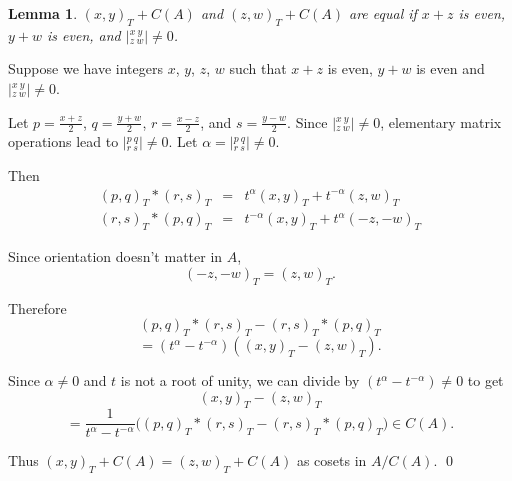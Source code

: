 \documentclass{slides}
\newtheorem{lemma}{Lemma}
\begin{document}
\begin{slide}
\begin{lemma}
$(x,y)_T + C(A)$ and $(z,w)_T + C(A)$ are equal
if $x + z$ is even, $y + w$ is
even, and ${|^{x~y}_{z~w}|} \neq 0$.
\label{lemma1}
\end{lemma}

\proof
Suppose we have integers $x$, $y$,
$z$, $w$ such that $x+z$ is even, $y + w$ is even and
${|^{x~y}_{z~w}|} \neq 0$.

Let $p = \frac{x+z}{2}$,
$q = \frac{y+w}{2}$, $r = \frac{x-z}{2}$, and $s = \frac{y-w}{2}$.
Since 
${|^{x~y}_{z~w}|} \neq 0$,
elementary matrix operations lead to
${|^{p~q}_{r~s}|} \neq 0$.
Let $\alpha =
{|^{p~q}_{r~s}|} \neq 0$.

Then 
\begin{eqnarray}
(p,q)_T * (r,s)_T & = & t^{\alpha} (x,y)_T + t^{-\alpha} (z,w)_T \nonumber \\
(r,s)_T * (p,q)_T & = & t^{-\alpha} (x,y)_T + t^{\alpha} (-z,-w)_T \nonumber
\end{eqnarray}
\end{slide}

\begin{slide}
Since orientation doesn't matter in $A$,
$$(-z,-w)_T = (z,w)_T.$$

Therefore
$$(p,q)_T * (r,s)_T - (r,s)_T * (p,q)_T$$
$$ = (t^{\alpha} - t^{-\alpha})((x,y)_T - (z,w)_T).$$

Since $\alpha \neq 0$ and $t$ is not a root of unity, we can divide by
$(t^{\alpha} - t^{-\alpha}) \neq 0$ to get
$$(x,y)_T - (z,w)_T$$
$$= \frac{1}{t^{\alpha} - t^{-\alpha}}
\Big( (p,q)_T * (r,s)_T - (r,s)_T * (p,q)_T \Big) \in C(A).$$

Thus $(x,y)_T + C(A) = (z,w)_T + C(A)$ as cosets in $A/C(A)$.
\qed
\end{slide}
\end{document}
